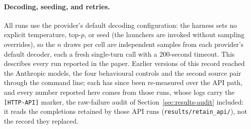 \documentclass[11pt]{article}
\theoremstyle{plain}
\theoremstyle{definition}
\theoremstyle{remark}
\begin{document}
\paragraph{Decoding, seeding, and retries.} All runs use the provider's default decoding
configuration: the harness sets no explicit temperature, top-$p$, or seed (the launchers are
invoked without sampling overrides), so the $n$ draws per cell
are independent samples from each provider's default decoder, each a fresh single-turn call with a
$200$-second timeout. This describes every run reported in the paper. Earlier versions of this
record reached the Anthropic models, the four
behavioural controls and the second source pair through the command line; each has since been
re-measured over the API path, and every number reported here comes from those runs, whose logs
carry the \texttt{[HTTP-API]} marker, the raw-failure audit of
Section~\ref{sec:results-audit} included: it reads the completions retained by those API runs
(\texttt{results/retain\_api/}), not the record they replaced.
\end{document}

